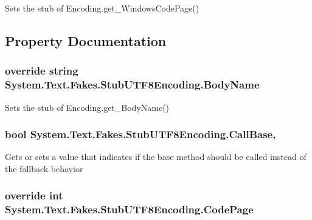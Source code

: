 Sets the stub of Encoding.\-get\-\_\-\-Windows\-Code\-Page()



\subsection{Property Documentation}
\hypertarget{class_system_1_1_text_1_1_fakes_1_1_stub_u_t_f8_encoding_ac37c1af53256f1c8362a6c9e396e739d}{
\subsubsection[{Body\-Name}]{\setlength{\rightskip}{0pt plus 5cm}override string System.\-Text.\-Fakes.\-Stub\-U\-T\-F8\-Encoding.\-Body\-Name\hspace{0.3cm}{\ttfamily [get]}}}\label{class_system_1_1_text_1_1_fakes_1_1_stub_u_t_f8_encoding_ac37c1af53256f1c8362a6c9e396e739d}


Sets the stub of Encoding.\-get\-\_\-\-Body\-Name()

\hypertarget{class_system_1_1_text_1_1_fakes_1_1_stub_u_t_f8_encoding_aaa6e34212c6804adb88ba19bc284c42e}{
\subsubsection[{Call\-Base}]{\setlength{\rightskip}{0pt plus 5cm}bool System.\-Text.\-Fakes.\-Stub\-U\-T\-F8\-Encoding.\-Call\-Base\hspace{0.3cm}{\ttfamily [get]}, {\ttfamily [set]}}}\label{class_system_1_1_text_1_1_fakes_1_1_stub_u_t_f8_encoding_aaa6e34212c6804adb88ba19bc284c42e}


Gets or sets a value that indicates if the base method should be called instead of the fallback behavior

\hypertarget{class_system_1_1_text_1_1_fakes_1_1_stub_u_t_f8_encoding_a3d653173f9629e09f583d28eefb1193c}{
\subsubsection[{Code\-Page}]{\setlength{\rightskip}{0pt plus 5cm}override int System.\-Text.\-Fakes.\-Stub\-U\-T\-F8\-Encoding.\-Code\-Page\hspace{0.3cm}{\ttfamily [get]}}}\label{class_system_1_1_text_1_1_fakes_1_1_stub_u_t_f8_encoding_a3d653173f9629e09f583d28eefb1193c}


